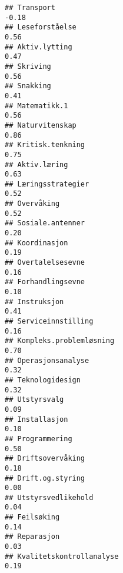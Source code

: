 \documentclass[
]{article}
\begin{document}
\begin{verbatim}
## Transport                                                                        -0.18
## Leseforståelse                                                                    0.56
## Aktiv.lytting                                                                     0.47
## Skriving                                                                          0.56
## Snakking                                                                          0.41
## Matematikk.1                                                                      0.56
## Naturvitenskap                                                                    0.86
## Kritisk.tenkning                                                                  0.75
## Aktiv.læring                                                                      0.63
## Læringsstrategier                                                                 0.52
## Overvåking                                                                        0.52
## Sosiale.antenner                                                                  0.20
## Koordinasjon                                                                      0.19
## Overtalelsesevne                                                                  0.16
## Forhandlingsevne                                                                  0.10
## Instruksjon                                                                       0.41
## Serviceinnstilling                                                                0.16
## Kompleks.problemløsning                                                           0.70
## Operasjonsanalyse                                                                 0.32
## Teknologidesign                                                                   0.32
## Utstyrsvalg                                                                       0.09
## Installasjon                                                                      0.10
## Programmering                                                                     0.50
## Driftsovervåking                                                                  0.18
## Drift.og.styring                                                                  0.00
## Utstyrsvedlikehold                                                                0.04
## Feilsøking                                                                        0.14
## Reparasjon                                                                        0.03
## Kvalitetskontrollanalyse                                                          0.19

\end{verbatim}
\end{document}
